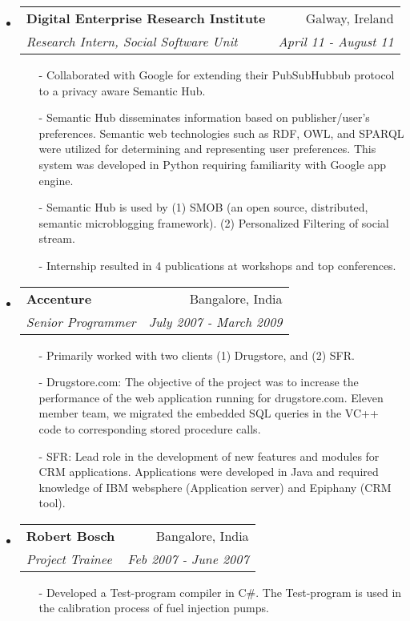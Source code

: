 \documentclass[letterpaper,9pt]{article}
\makeatletter
\newcommand{\ressubheading}[4]{
\begin{tabular*}{7.0in}{l@{\extracolsep{\fill}}r}
		\textbf{#1} & #2 \\
		\textit{#3} & \textit{#4} \\
\end{tabular*}\vspace{-6pt}}
\makeatother
\begin{document}
\begin{itemize}
\item
	\ressubheading{Digital Enterprise Research Institute}{Galway, Ireland}{Research Intern, Social Software Unit}{April 11 - August 11}
\begin{itemize}
\item[-] Collaborated with Google for extending their PubSubHubbub protocol to a privacy aware Semantic Hub. 
\item[-] Semantic Hub disseminates information based on publisher/user's preferences. Semantic web technologies such as RDF, OWL, and SPARQL were utilized for determining and representing user preferences. This system was developed in Python requiring familiarity with Google app engine. 
\item[-] Semantic Hub is used by (1) SMOB (an open source, distributed, semantic microblogging framework). (2) Personalized Filtering of social stream.
\item[-] Internship resulted in 4 publications at workshops and top conferences. 
\end{itemize}

\item
\ressubheading{Accenture}{Bangalore, India}{Senior Programmer}{July 2007 - March 2009}
\begin{itemize}
\item[-]Primarily worked with two clients (1) Drugstore, and (2) SFR. 

\item[-]Drugstore.com: The objective of the project was to increase the performance of the web application running for drugstore.com. Eleven member team, we migrated the embedded SQL queries in the VC++ code to corresponding stored procedure calls. 

\item[-]SFR: Lead role in the development of new features and modules for CRM applications. Applications were developed in Java and required knowledge of IBM websphere (Application server) and Epiphany (CRM tool).     

\end{itemize}

\item
	\ressubheading{Robert Bosch}{Bangalore, India}{Project Trainee}{Feb 2007 - June 2007}
\begin{itemize}
\item[-] Developed a Test-program compiler in C\#. The Test-program is used in the calibration process of fuel injection pumps.
\end{itemize}

\end{itemize}
\end{document}

